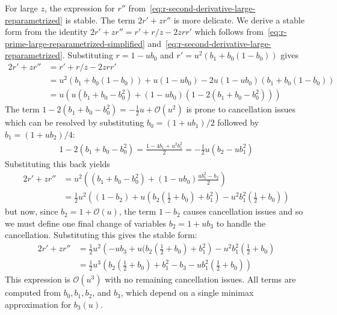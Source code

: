 \documentclass{article}
\begin{document}
For large $z$, the expression for $r''$ from~\eqref{eq:r-second-derivative-large-reparametrized} is stable.
The term $2r'+zr''$ is more delicate.
We derive a stable form from the identity $2r' + zr'' = r' + r/z - 2zrr'$ which follows from~\eqref{eq:r-prime-large-reparametrized-simplified} and~\eqref{eq:r-second-derivative-large-reparametrized}.
Substituting $r=1-ub_0$ and $r'=u^2(b_1+b_0(1-b_0))$ gives
%
\begin{align}
  2r' + zr'' & = r' + r/z - 2zrr'                                              \\
             & = u^2 (b_1+b_0(1-b_0)) + u(1-ub_0) - 2u(1-ub_0)(b_1+b_0(1-b_0)) \\
             & = u ( u(b_1+b_0-b_0^2) + (1-ub_0)(1 - 2(b_1+b_0-b_0^2)) )
\end{align}
%
The term $1-2(b_1+b_0-b_0^2) = -\frac{1}{2}u + \mathcal{O}(u^2)$ is prone to cancellation issues which can be resolved by substituting $b_0=(1+ub_1)/2$ followed by $b_1=(1+ub_2)/4$:
%
\begin{align}
  1-2(b_1+b_0-b_0^2) = \frac{1-4b_1+u^2 b_1^2}{2} = -\frac{1}{2}u(b_2 - u b_1^2)
\end{align}
%
Substituting this back yields
%
\begin{align}
  2r' + zr'' & = u^2 \left( (b_1+b_0-b_0^2) + (1-ub_0)\frac{u b_1^2 - b_2}{2} \right)                                          \\
             & = \frac{1}{2} u^2 \left( (1-b_2) + u (b_2 (\frac{1}{2}+b_0 ) + b_1^2 ) - u^2 b_1^2 (\frac{1}{2} + b_0 ) \right)
\end{align}
%
but now, since $b_2 = 1 + \mathcal{O}(u)$, the term $1-b_2$ causes cancellation issues and so we must define one final change of variables $b_2 = 1 + u b_3$ to handle the cancellation.
Substituting this gives the stable form:
%
\begin{align}
  2r' + zr'' & = \frac{1}{2} u^2 \left( -u b_3 + u (b_2 (\frac{1}{2}+b_0 ) + b_1^2 \right) - u^2 b_1^2 ( \frac{1}{2} + b_0 )                                \\
             & = \frac{1}{2} u^3 \left( b_2 (\frac{1}{2}+b_0 ) + b_1^2 - b_3 - u b_1^2 (\frac{1}{2} + b_0) \right) \label{eq:2rprime-zrsecondprime-large-z}
\end{align}
%
This expression is $\mathcal{O}(u^3)$ with no remaining cancellation issues.
All terms are computed from $b_0, b_1, b_2$, and $b_3$, which depend on a single minimax approximation for $b_3(u)$.
\end{document}
